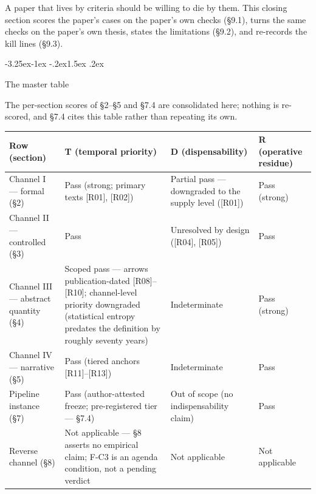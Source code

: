 \documentclass[11pt,a4paper]{article}
\makeatletter
\renewcommand\subsection{\@startsection{subsection}{2}{\z@}%
  {-3.25ex\@plus -1ex \@minus -.2ex}{1.5ex \@plus .2ex}%
  {\normalfont\large\bfseries\raggedright}}
\makeatother
\begin{document}
A paper that lives by criteria should be willing to die by them. This closing section scores the paper's cases on the paper's own checks (§9.1), turns the same checks on the paper's own thesis, states the limitations (§9.2), and re-records the kill lines (§9.3).

\subsection{The master table}

The per-section scores of §2–§5 and §7.4 are consolidated here; nothing is re-scored, and §7.4 cites this table rather than repeating its own.

\begin{table}[htbp]
\centering
\footnotesize
\setlength{\tabcolsep}{3.5pt}
\renewcommand{\arraystretch}{1.18}
\begin{tabularx}{0.985\textwidth}{@{}>{\raggedright\arraybackslash}p{}>{\raggedright\arraybackslash}X>{\raggedright\arraybackslash}X>{\raggedright\arraybackslash}X@{}}
\toprule
\textbf{Row (section)} & \textbf{T (temporal priority)} & \textbf{D (dispensability)} & \textbf{R (operative residue)} \\
\midrule
Channel I — formal (§2) & Pass (strong; primary texts [R01], [R02]) & Partial pass — downgraded to the supply level ([R01]) & Pass (strong) \\
Channel II — controlled (§3) & Pass & Unresolved by design ([R04], [R05]) & Pass \\
Channel III — abstract quantity (§4) & Scoped pass — arrows publication-dated [R08]–[R10]; channel-level priority downgraded (statistical entropy predates the definition by roughly seventy years) & Indeterminate & Pass (strong) \\
Channel IV — narrative (§5) & Pass (tiered anchors [R11]–[R13]) & Indeterminate & Pass \\
Pipeline instance (§7) & Pass (author-attested freeze; pre-registered tier — §7.4) & Out of scope (no indispensability claim) & Pass \\
Reverse channel (§8) & Not applicable — §8 asserts no empirical claim; F-C3 is an agenda condition, not a pending verdict & Not applicable & Not applicable \\
\bottomrule
\end{tabularx}
\end{table}
\end{document}

